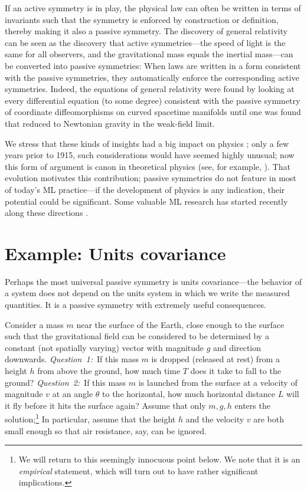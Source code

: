 \documentclass[accepted]{article}
\begin{document}
If an active symmetry is in play, the physical law can often be written in terms of invariants such that the symmetry is enforced by construction or definition, thereby making it also a passive symmetry.
The discovery of general relativity \citep{gr} can be seen as the discovery that active symmetries---the speed of light is the same for all observers, and the gravitational mass equals the inertial mass---can be converted into passive symmetries:
When laws are written in a form consistent with the passive symmetries, they automatically enforce the corresponding active symmetries. 
Indeed, the equations of general relativity were found by looking at every differential equation (to some degree) consistent with the passive symmetry of coordinate diffeomorphisms on curved spacetime manifolds until one was found that reduced to Newtonian gravity in the weak-field limit.

We stress that these kinds of insights had a big impact on physics \citep{EARMAN1978251};
only a few years prior to 1915, such considerations would have seemed highly unusual;
now this form of argument is canon in theoretical physics (see, for example, \citealt{zee2016group}).
That evolution motivates this contribution; passive symmetries do not feature in most of today's ML practice---if the development of physics is any indication, their potential could be significant.
Some valuable ML research has started recently along these directions \citep{weiler, bronstein2021geometric}.

\section{Example: Units covariance}\label{sec:units}
Perhaps the most universal passive symmetry is units covariance---the behavior of a system does not depend on the units system in which we write the measured quantities.
It is a passive symmetry with extremely useful consequences.

Consider a mass $m$ near the surface of the Earth, close enough to the surface such that the gravitational field can be considered to be determined by a constant (not spatially varying) vector with magnitude $g$ and direction downwards.
\textsl{Question~1:}~If this mass $m$ is dropped (released at rest) from a height $h$ from above the ground, how much time $T$ does it take to fall to the ground?
\textsl{Question~2:}~If this mass $m$ is launched from the surface at a velocity of magnitude $v$ at an angle $\theta$ to the horizontal, how much horizontal distance $L$ will it fly before it hits the surface again?
Assume that only $m, g, h$ enters the solution;\footnote{We will return to this seemingly innocuous point below. We note that it is an \emph{empirical} statement, which will turn out to have rather significant implications.} In particular, assume that the height $h$ and the velocity $v$ are both small enough so that air resistance, say, can be ignored.
\end{document}

